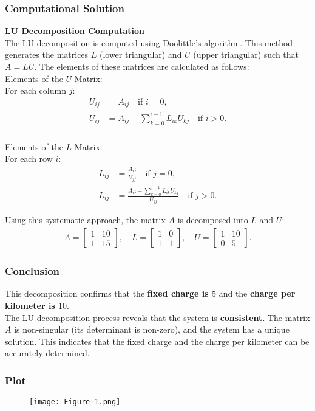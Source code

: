 \documentclass{beamer}
\begin{document}
\begin{frame}
\frametitle{Computational Solution}
\textbf{LU Decomposition Computation}\\
The LU decomposition is computed using Doolittle's algorithm. This method generates the matrices \( L \) (lower triangular) and \( U \) (upper triangular) such that \( A = LU \). The elements of these matrices are calculated as follows: \\
Elements of the \( U \) Matrix:  \\
For each column \( j \):
\begin{align}
    U_{ij} &= A_{ij} \quad \text{if } i = 0, \\
    U_{ij} &= A_{ij} - \sum_{k=0}^{i-1} L_{ik} U_{kj} \quad \text{if } i > 0.
\end{align}
    
\end{frame}

\begin{frame}
\frametitle{}
Elements of the \( L \) Matrix: \\
For each row \( i \):
\begin{align}
    L_{ij} &= \frac{A_{ij}}{U_{jj}} \quad \text{if } j = 0, \\
    L_{ij} &= \frac{A_{ij} - \sum_{k=0}^{j-1} L_{ik} U_{kj}}{U_{jj}} \quad \text{if } j > 0.
\end{align}

Using this systematic approach, the matrix \( A \) is decomposed into \( L \) and \( U \):
\begin{align}
    A = \begin{bmatrix}1 & 10\\1 & 15\end{bmatrix}, \quad L = \begin{bmatrix}1 & 0\\1 & 1\end{bmatrix}, \quad U = \begin{bmatrix}1 & 10\\0 & 5\end{bmatrix}.
\end{align}
    
\end{frame}
\begin{frame}
\frametitle{Conclusion}
This decomposition confirms that the \textbf{fixed charge is $ 5 $}  and the \textbf{charge per kilometer is $ 10 $}.\\


The LU decomposition process reveals that the system is \textbf{consistent}. The matrix \( A \) is non-singular (its determinant is non-zero), and the system has a unique solution. This indicates that the fixed charge and the charge per kilometer can be accurately determined.\\
    
\end{frame}
\begin{frame}
\frametitle{Plot}
\begin{figure}[h!]
	\centering
	\texttt{[image: Figure\_1.png]}
	\label{stemplot}
\end{figure}	
\end{frame}
\end{document}
